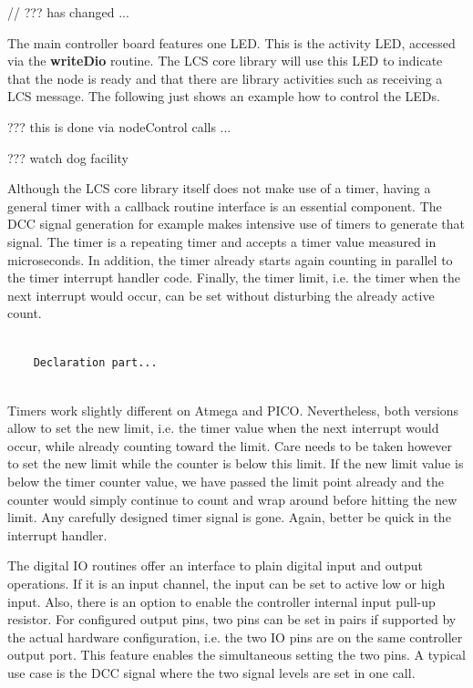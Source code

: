 // ??? has changed ...



The main controller board features one LED. This is the activity LED, accessed via the \textbf{writeDio} routine. The LCS core library will use this LED to indicate that the node is ready and that there are library activities such as receiving a LCS message. The following just shows an example how to control the LEDs.

??? this is done via nodeControl calls ...


??? watch dog facility



Although the LCS core library itself does not make use of a timer, having a general timer with a callback routine interface is an essential component. The DCC signal generation for example makes intensive use of timers to generate that signal. The timer is a repeating timer and accepts a timer value measured in microseconds. In addition, the timer already starts again counting in parallel to the timer interrupt handler code. Finally, the timer limit, i.e. the timer when the next interrupt would occur, can be set without disturbing the already active count.

\lstset{language=c++, style=codesnippetstyle}
\begin{lstlisting}
   
    Declaration part...
    
\end{lstlisting}
\FloatBarrier

Timers work slightly different on Atmega and PICO. Nevertheless, both versions allow to set the new limit, i.e. the timer value when the next interrupt would occur, while already counting toward the limit. Care needs to be taken however to set the new limit while the counter is below this limit. If the new limit value is below the timer counter value, we have passed the limit point already and the counter would simply continue to count and wrap around before hitting the new limit. Any carefully designed timer signal is gone. Again, better be quick in the interrupt handler.


The digital IO routines offer an interface to plain digital input and output operations. If it is an input channel, the input can be set to active low or high input. Also, there is an option to enable the controller internal input pull-up resistor. For configured output pins, two pins can be set in pairs if supported by the actual hardware configuration, i.e. the two IO pins are on the same controller output port. This feature enables the simultaneous setting the two pins. A typical use case is the DCC signal where the two signal levels are set in one call.

